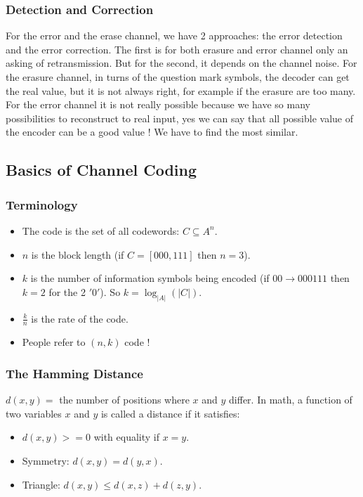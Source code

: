 \documentclass{article}
\begin{document}
\subsubsection{Detection and Correction}
For the error and the erase channel, we have 2 approaches: the error detection and the error correction. The first is for both erasure and error channel only an asking of retransmission. But for the second, it depends on the channel noise. For the erasure channel, in turns of the question mark symbols, the decoder can get the real value, but it is not always right, for example if the erasure are too many. For the error channel it is not really possible because we have so many possibilities to reconstruct to real input, yes we can say that all possible value of the encoder can be a good value ! We have to find the most similar.

\subsection{Basics of Channel Coding}
\subsubsection{Terminology}
\begin{itemize}
\item The code is the set of all codewords: $ C \subseteq A^n $.
\item $ n $ is the block length (if $ C = [000,111] $ then $ n = 3 $).
\item $ k $ is the number of information symbols being encoded (if $ 00 \rightarrow 000111 $ then $ k = 2 $ for the 2 $ '0' $). So $ k = \log_{|A|}(|C|) $.
\item $ \frac{k}{n} $ is the rate of the code.
\item People refer to $ (n,k) $ code ! 
\end{itemize}

\subsubsection{The Hamming Distance}
$ d(x,y) = $ the number of positions where $ x $ and $ y $ differ. In math, a function of two variables $ x $ and $ y $ is called a distance if it satisfies:
\begin{itemize}
\item $ d(x,y) >= 0 $ with equality if $ x = y $.
\item Symmetry: $ d(x,y) = d(y,x) $.
\item Triangle: $ d(x,y) \leq d(x,z) + d(z,y) $.
\end{itemize}  
\end{document}
